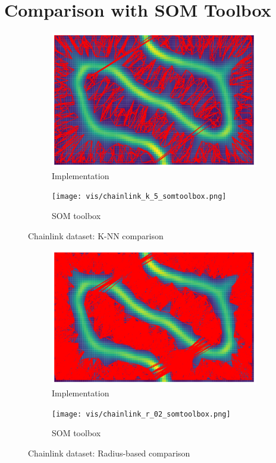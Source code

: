 \documentclass[12pt]{article}
\begin{document}
\section{Comparison with SOM Toolbox}
\begin{figure}[t]
    \centering
    \begin{subfigure}{.5\textwidth}
      \centering
      \includegraphics[width=.9\linewidth]{vis/chainlink_k_5.png}
      \caption{Implementation}
    \end{subfigure}%
    \begin{subfigure}{.5\textwidth}
      \centering
      \texttt{[image: vis/chainlink\_k\_5\_somtoolbox.png]}
      \caption{SOM toolbox}
    \end{subfigure}
    \caption{Chainlink dataset: K-NN comparison}
    \label{fig:chainlinkknncomparison}
\end{figure}
\begin{figure}[t]
    \centering
    \begin{subfigure}{.5\textwidth}
        \centering
        \includegraphics[width=.9\linewidth]{vis/chainlink_r_02.png}
        \caption{Implementation}
    \end{subfigure}%
    \begin{subfigure}{.5\textwidth}
        \centering
        \texttt{[image: vis/chainlink\_r\_02\_somtoolbox.png]}
        \caption{SOM toolbox}
    \end{subfigure}
    \caption{Chainlink dataset: Radius-based comparison}
    \label{fig:chainlinkradiuscomparison}
\end{figure}
\end{document}
